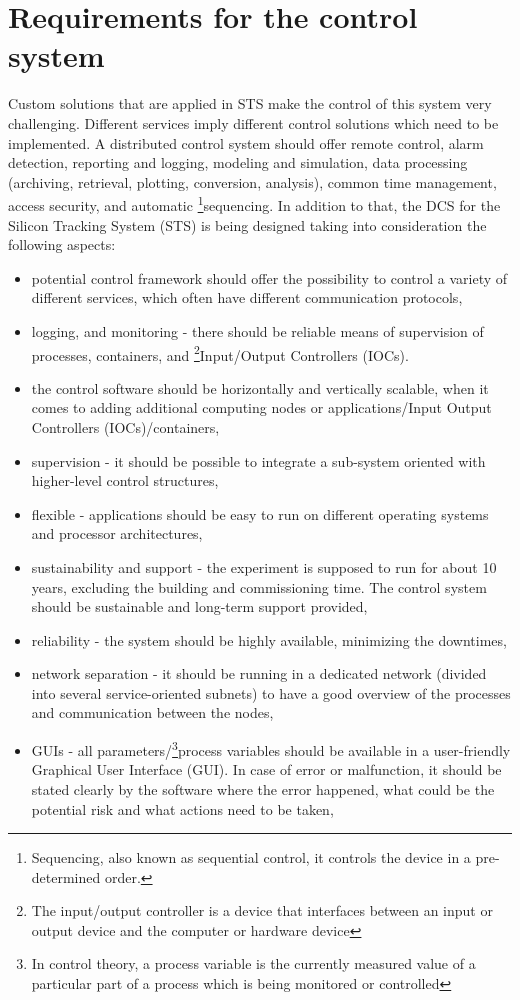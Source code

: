 \section{Requirements for the control system}
\label{sys:req}
Custom solutions that are applied in \gls{STS} make the control of this system very challenging. Different services imply different control solutions which need to be implemented.
A distributed control system should offer remote control, alarm detection, reporting and logging, modeling and simulation, data processing (archiving, retrieval, plotting, conversion, analysis), common time management, access security, and automatic \footnote{Sequencing, also known as sequential control, it controls the device in a pre-determined order.}{sequencing}.
In addition to that, the \gls{DCS} for the Silicon Tracking System (\gls{STS}) is being designed taking into consideration the following aspects:

 
 \begin{itemize}
    \item potential control framework should offer the possibility to control a variety of different services, which often have different communication protocols,
    \item logging, and monitoring - there should be reliable means of supervision of processes, containers, and \footnote{The input/output controller is a device that interfaces between an input or output device and the computer or hardware device}{Input/Output Controllers} (\glspl{IOC}).
    \item the control software should be horizontally and vertically scalable, when it comes to adding additional computing nodes or applications/Input Output Controllers (\glspl{IOC})/containers,
    \item supervision - it should be possible to integrate a sub-system oriented with higher-level control structures,
     \item flexible - applications should be easy to run on different operating systems and processor architectures,
     \item sustainability and support - the experiment is supposed to run for about 10 years, excluding the building and commissioning time. The control system should be sustainable and long-term support provided,
     \item reliability - the system should be highly available, minimizing the downtimes,
     \item network separation - it should be running in a dedicated network (divided into several service-oriented subnets) to have a good overview of the processes and communication between the nodes,
     \item \glspl{GUI} - all parameters/\footnote{In control theory, a process variable is the currently measured value of a particular part of a process which is being monitored or controlled}{process variables} should be available in a user-friendly Graphical User Interface (\gls{GUI}). In case of error or malfunction, it should be stated clearly by the software where the error happened, what could be the potential risk and what actions need to be taken,

 \end{itemize}


